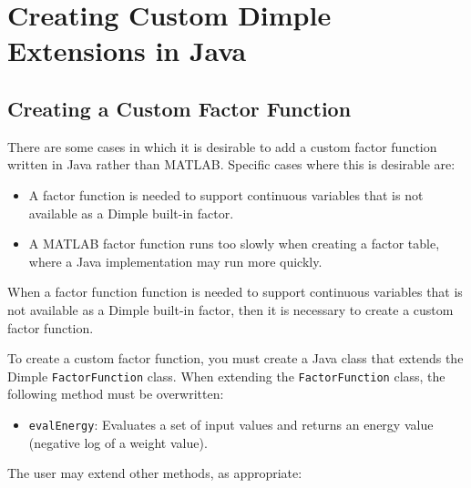 \section{Creating Custom Dimple Extensions \ifmatlab in Java\fi}
\label{sec:userJava}

\subsection{Creating a Custom Factor Function}

\ifmatlab
There are some cases in which it is desirable to add a custom factor function written in Java rather than MATLAB.  Specific cases where this is desirable are:
%
\begin{itemize}
\item A factor function is needed to support continuous variables that is not available as a Dimple built-in factor.
\item A MATLAB factor function runs too slowly when creating a factor table, where a Java implementation may run more quickly.
\end{itemize}
\fi

\ifjava
When a factor function function is needed to support continuous variables that is not available as a Dimple built-in factor, then it is necessary to create a custom factor function.
\fi

To create a custom factor function, you must create a Java class that extends the Dimple \texttt{FactorFunction} class.  When extending the \texttt{FactorFunction} class, the following method must be overwritten:
%
\begin{itemize}
\item \texttt{evalEnergy}: Evaluates a set of input values and returns an energy value (negative log of a weight value).
\end{itemize}


The user may extend other methods, as appropriate:

